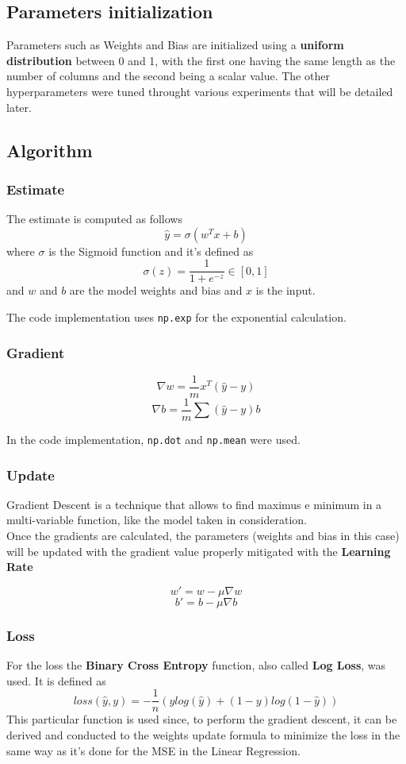 \documentclass[
	letterpaper, %
	10pt, %
]{class}
\begin{document}
\subsection{Parameters initialization}
Parameters such as Weights and Bias are initialized using a \textbf{uniform distribution} between 0 and 1, with the first one having the same length as the number of columns and the second being a scalar value.
The other hyperparameters were tuned throught various experiments that will be detailed later.

\subsection{Algorithm}

\subsubsection{Estimate}
The estimate is computed as follows
$$ \hat{y} = \sigma(w^Tx + b) $$
where $\sigma$ is the Sigmoid function \cite{sigmoid} and it's defined as
$$ \sigma(z) = \frac{1}{1 + e^{-z}} \in [0,1] $$
and $w$ and $b$ are the model weights and bias and $x$ is the input.

The code implementation uses \texttt{np.exp} for the exponential calculation.

\subsubsection{Gradient}

$$ \nabla w = \frac{1}{m}x^T(\hat{y} - y) $$
$$ \nabla b = \frac{1}{m}\sum(\hat{y} - y) b $$

In the code implementation, \texttt{np.dot} and \texttt{np.mean} were used.

\subsubsection{Update}

Gradient Descent \cite{sgd} is a technique that allows to find maximus e minimum in a multi-variable function, like the model taken in consideration.\\
Once the gradients are calculated, the parameters (weights and bias in this case) will be updated with the gradient value properly mitigated with the \textbf{Learning Rate}

$$ w' = w - \mu \nabla w $$
$$ b' = b - \mu \nabla b $$

\subsubsection{Loss}
For the loss the \textbf{Binary Cross Entropy} \cite{binarycrossentropy} function, also called \textbf{Log Loss}, was used.
It is defined as
$$ loss(\hat{y}, y) = -\frac{1}{n}(y log(\hat{y}) + (1-y)log(1-\hat{y})) $$
This particular function is used since, to perform the gradient descent, it can be derived and conducted to the weights update formula to minimize the loss in the same way as it's done for the MSE \cite{mse} in the Linear Regression.\\
\end{document}
